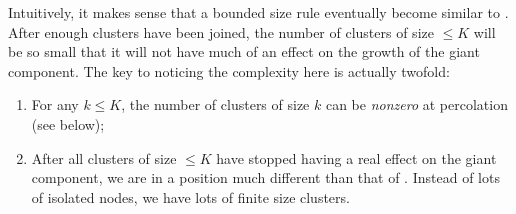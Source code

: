 \documentclass[twoside,10pt]{article}
\begin{document}
Intuitively, it makes sense that a bounded size rule eventually become similar to \ER. After enough clusters have been joined, the number of clusters of size $\leq K$ will be so small that it will not have much of an effect on the growth of the giant component. The key to noticing the complexity here is actually twofold:

\begin{enumerate}
	\item For any $k \leq K$, the number of clusters of size $k$ can be \textit{nonzero} at percolation (see  below);
        \item After all clusters of size $\leq K$ have stopped having a real effect on the giant component, we are in a position much different than that of \ER. Instead of lots of isolated nodes, we have lots of finite size clusters.
\end{enumerate}
\end{document}
